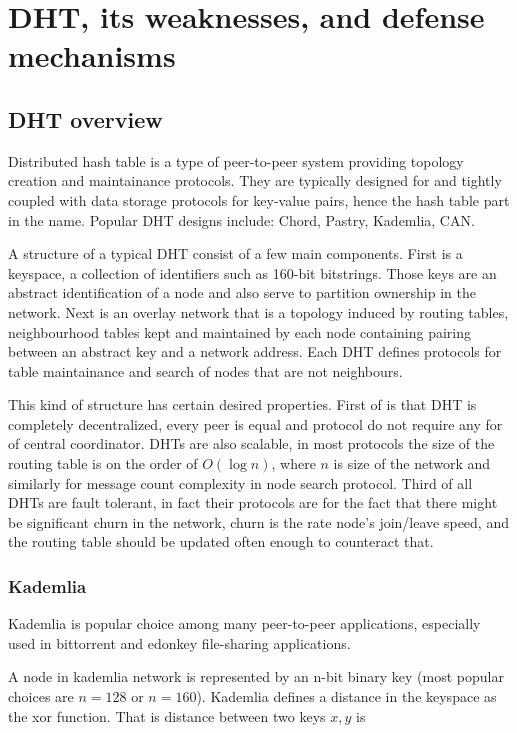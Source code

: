 \chapter{DHT, its weaknesses, and defense mechanisms}
\section{DHT overview}

  Distributed hash table is a type of peer-to-peer system providing topology
  creation and maintainance protocols. They are typically designed for and
  tightly coupled with data storage protocols for key-value pairs, hence the
  hash table part in the name. Popular DHT designs include: Chord, Pastry,
  Kademlia, CAN.

  A structure of a typical DHT consist of a few main components. First is a
  keyspace, a collection of identifiers such as 160-bit bitstrings. Those keys
  are an abstract identification of a node and also serve to partition ownership
  in the network. Next is an overlay network that is a topology induced by
  routing tables, neighbourhood tables kept and maintained by each node
  containing pairing between an abstract key and a network address. Each DHT
  defines protocols for table maintainance and search of nodes that are not
  neighbours.

  This kind of structure has certain desired properties. First of is that DHT is
  completely decentralized, every peer is equal and protocol do not require any
  for of central coordinator. DHTs are also scalable, in most protocols the size
  of the routing table is on the order of $O(\log n)$, where $n$ is size of the
  network and similarly for message count complexity in node search protocol.
  Third of all DHTs are fault tolerant, in fact their protocols are for the fact
  that there might be significant churn in the network, churn is the rate node's
  join/leave speed, and the routing table should be updated often enough to
  counteract that.
 
  \subsection{Kademlia}
  Kademlia \cite{may02} is popular choice among many peer-to-peer applications,
  especially used in bittorrent and edonkey file-sharing applications.

  A node in kademlia network is represented by an n-bit binary key (most popular
  choices are $n = 128$ or $n = 160$). Kademlia defines a distance in the
  keyspace as the xor function. That is distance between two keys $x, y$ is

